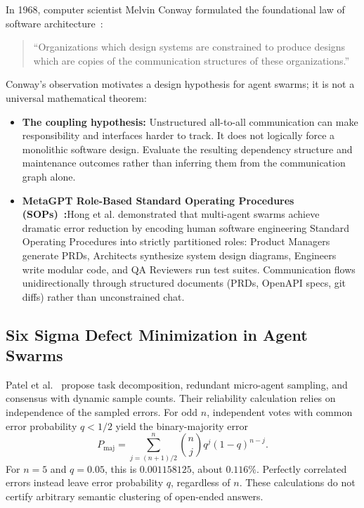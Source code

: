 In 1968, computer scientist Melvin Conway formulated the foundational law of software architecture~:
\begin{quote}
``Organizations which design systems are constrained to produce designs which are copies of the communication structures of these organizations.''
\end{quote}
Conway's observation motivates a design hypothesis for agent swarms; it is not a universal mathematical theorem:
\begin{itemize}[leftmargin=1.8em,itemsep=2pt]
  \item \textbf{The coupling hypothesis:} Unstructured all-to-all communication can make responsibility and interfaces harder to track. It does not logically force a monolithic software design. Evaluate the resulting dependency structure and maintenance outcomes rather than inferring them from the communication graph alone.
  \item \textbf{MetaGPT Role-Based Standard Operating Procedures (SOPs)~:}\enspace Hong et al. demonstrated that multi-agent swarms achieve dramatic error reduction by encoding human software engineering Standard Operating Procedures into strictly partitioned roles: Product Managers generate PRDs, Architects synthesize system design diagrams, Engineers write modular code, and QA Reviewers run test suites. Communication flows unidirectionally through structured documents (PRDs, OpenAPI specs, git diffs) rather than unconstrained chat.
\end{itemize}

\subsection{Six Sigma Defect Minimization in Agent Swarms}

Patel et al.~ propose task decomposition, redundant micro-agent sampling, and consensus with dynamic sample counts. Their reliability calculation relies on independence of the sampled errors. For odd $n$, independent votes with common error probability $q<1/2$ yield the binary-majority error
\begin{equation}
P_{\mathrm{maj}}=\sum_{j=(n+1)/2}^{n}{n\choose j}q^j(1-q)^{n-j}.
\end{equation}
For $n=5$ and $q=0.05$, this is $0.001158125$, about $0.116\%$. Perfectly correlated errors instead leave error probability $q$, regardless of $n$. These calculations do not certify arbitrary semantic clustering of open-ended answers.

